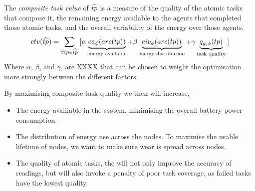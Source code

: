 \begin{definition}
	The \textit{composite task value} of $\varCompositeTask{}{}$ is a measure of the quality of the atomic tasks that compose it, the remaining energy available to the agents that completed those atomic tasks, and the overall variability of the energy over those agents. 
	\begin{equation}
		\functionCompositeTaskValue{}{} = 
		\sum_{\forall \varAtomicTask{}{} \in \varCompositeTask{}{}}
		\big\lbrack
		\alpha\underbrace{\functionEnergyAvailable{\functionTaskArc{}{}}{}}_{\text{energy available}}
		+ \beta\underbrace{\functionEnergyInverseVariability{\functionTaskArc{}{}}{}}_{\text{energy distribution}}
		+ 
		\gamma\underbrace{\functionAtomicTaskQualitySignature{}{}}_{\text{task quality}}
		\big\rbrack
	\end{equation}
Where $\alpha$, $\beta$, and $\gamma$, are XXXX that can be chosen to weight the optimisation more strongly between the different factors.
\end{definition}
By maximising composite task quality we then will increase,
\begin{itemize}
	\item The energy availiable in the system, minimising the overall battery power consumption.
	\item The distribution of energy use across the nodes. To maximise the usable lifetime of nodes, we want to make sure wear is spread across nodes. 
	\item The quality of atomic tasks, the will not only improve the accuracy of readings, but will also invoke a penalty of poor task coverage, as failed tasks have the lowest quality.
\end{itemize}
